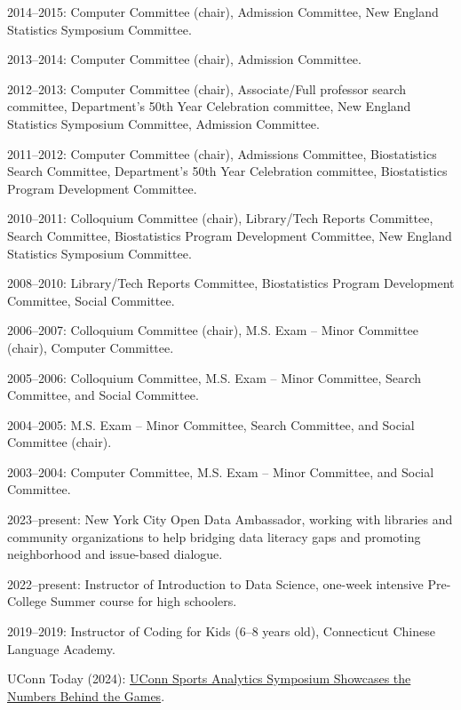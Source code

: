 \documentclass[Statistics]{vita}
\begin{document}
\begin{vita}
\begin{Services}
\begin{DepartmentalService}
  \item 2014--2015: Computer Committee (chair), Admission Committee, New England Statistics Symposium Committee.
  \item 2013--2014: Computer Committee (chair), Admission Committee.
  \item 2012--2013: Computer Committee (chair), Associate/Full professor search committee, Department's 50th Year Celebration committee, New England Statistics Symposium Committee, Admission Committee.
  \item 2011--2012: Computer Committee (chair), Admissions Committee, Biostatistics Search Committee,  Department's 50th Year Celebration committee, Biostatistics Program Development Committee.
  \item 2010--2011: Colloquium Committee (chair), Library/Tech Reports Committee, Search Committee, Biostatistics Program Development Committee, New England Statistics Symposium Committee.
  \item 2008--2010: Library/Tech Reports Committee, Biostatistics Program Development Committee, Social Committee.
  \item 2006--2007: Colloquium Committee (chair), M.S. Exam -- Minor Committee (chair), Computer Committee.
  \item 2005--2006: Colloquium Committee, M.S. Exam -- Minor Committee, Search Committee, and Social Committee.
  \item 2004--2005: M.S. Exam -- Minor Committee, Search Committee, and Social Committee (chair).
  \item 2003--2004: Computer Committee, M.S. Exam -- Minor Committee, and Social Committee.
  \end{DepartmentalService}
  \begin{Outreaches}
  \item 2023--present: New York City Open Data Ambassador, working with libraries and community organizations to help bridging data literacy gaps and promoting neighborhood and issue-based dialogue.
  \item 2022--present: Instructor of Introduction to Data Science, one-week intensive Pre-College Summer course for high schoolers.
  \item 2019--2019: Instructor of Coding for Kids (6--8 years old), Connecticut  Chinese Language Academy.
  \end{Outreaches}
  \begin{Media}
  \item UConn Today (2024): \href{https://today.uconn.edu/2024/04/uconn-sports-analytics-symposium-returns-for-fifth-time/}{UConn Sports Analytics Symposium Showcases the Numbers Behind the Games}.

\end{Media}
\end{Services}
\end{vita}
\end{document}
